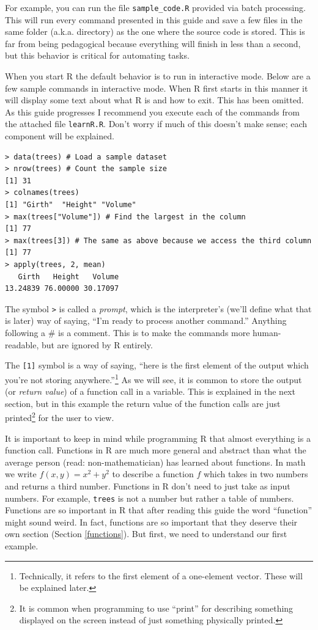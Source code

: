 \documentclass[12pt]{article}
\theoremstyle{remark}
\begin{document}
For example, you can run the file \verb|sample_code.R| provided via batch processing. This will run every command presented in this guide and save a few files in the same folder (a.k.a. directory) as the one where the source code is stored. This is far from being pedagogical because everything will finish in less than a second, but this behavior is critical for automating tasks.

When you start R the default behavior is to run in interactive mode. Below are a few sample commands in interactive mode. When R first starts in this manner it will display some text about what R is and how to exit. This has been omitted. As this guide progresses I recommend you execute each of the commands from the attached file \verb|learnR.R|. Don't worry if much of this doesn't make sense; each component will be explained.

\begin{Verbatim}[frame=single, fontsize=\small]
> data(trees) # Load a sample dataset
> nrow(trees) # Count the sample size
[1] 31
> colnames(trees)
[1] "Girth"  "Height" "Volume"
> max(trees["Volume"]) # Find the largest in the column
[1] 77
> max(trees[3]) # The same as above because we access the third column
[1] 77
> apply(trees, 2, mean)
   Girth   Height   Volume 
13.24839 76.00000 30.17097 
\end{Verbatim}

The symbol \verb|>| is called a \emph{prompt}, which is the interpreter's (we'll define what that is later) way of saying, ``I'm ready to process another command.'' Anything following a \# is a comment. This is to make the commands more human-readable, but are ignored by R entirely.

The \verb|[1]| symbol is a way of saying, ``here is the first element of the output which you're not storing anywhere.''\footnote{Technically, it refers to the first element of a one-element vector. These will be explained later.} As we will see, it is common to store the output (or \emph{return value}) of a function call in a variable. This is explained in the next section, but in this example the return value of the function calls are just printed\footnote{It is common when programming to use ``print'' for describing something displayed on the screen instead of just something physically printed.} for the user to view.

It is important to keep in mind while programming R that almost everything is a function call. Functions in R are much more general and abstract than what the average person (read: non-mathematician) has learned about functions. In math we write $f(x, y) = x^2 + y^2$ to describe a function $f$ which takes in two numbers and returns a third number. Functions in R don't need to just take as input numbers. For example, \verb|trees| is not a number but rather a table of numbers. Functions are so important in R that after reading this guide the word ``function'' might sound weird. In fact, functions are so important that they deserve their own section (Section \ref{functions}). But first, we need to understand our first example.
\end{document}
